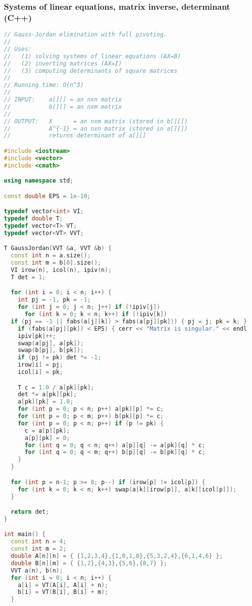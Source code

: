 \subsubsection{Systems of linear equations, matrix inverse, determinant (C++)}
\begin{lstlisting}[language=C++]
// Gauss-Jordan elimination with full pivoting.
//
// Uses:
//   (1) solving systems of linear equations (AX=B)
//   (2) inverting matrices (AX=I)
//   (3) computing determinants of square matrices
//
// Running time: O(n^3)
//
// INPUT:    a[][] = an nxn matrix
//           b[][] = an nxm matrix
//
// OUTPUT:   X      = an nxm matrix (stored in b[][])
//           A^{-1} = an nxn matrix (stored in a[][])
//           returns determinant of a[][]

#include <iostream>
#include <vector>
#include <cmath>

using namespace std;

const double EPS = 1e-10;

typedef vector<int> VI;
typedef double T;
typedef vector<T> VT;
typedef vector<VT> VVT;

T GaussJordan(VVT &a, VVT &b) {
  const int n = a.size();
  const int m = b[0].size();
  VI irow(n), icol(n), ipiv(n);
  T det = 1;

  for (int i = 0; i < n; i++) {
    int pj = -1, pk = -1;
    for (int j = 0; j < n; j++) if (!ipiv[j])
      for (int k = 0; k < n; k++) if (!ipiv[k])
  if (pj == -1 || fabs(a[j][k]) > fabs(a[pj][pk])) { pj = j; pk = k; }
    if (fabs(a[pj][pk]) < EPS) { cerr << "Matrix is singular." << endl; exit(0); }
    ipiv[pk]++;
    swap(a[pj], a[pk]);
    swap(b[pj], b[pk]);
    if (pj != pk) det *= -1;
    irow[i] = pj;
    icol[i] = pk;

    T c = 1.0 / a[pk][pk];
    det *= a[pk][pk];
    a[pk][pk] = 1.0;
    for (int p = 0; p < n; p++) a[pk][p] *= c;
    for (int p = 0; p < m; p++) b[pk][p] *= c;
    for (int p = 0; p < n; p++) if (p != pk) {
      c = a[p][pk];
      a[p][pk] = 0;
      for (int q = 0; q < n; q++) a[p][q] -= a[pk][q] * c;
      for (int q = 0; q < m; q++) b[p][q] -= b[pk][q] * c;      
    }
  }

  for (int p = n-1; p >= 0; p--) if (irow[p] != icol[p]) {
    for (int k = 0; k < n; k++) swap(a[k][irow[p]], a[k][icol[p]]);
  }

  return det;
}

int main() {
  const int n = 4;
  const int m = 2;
  double A[n][n] = { {1,2,3,4},{1,0,1,0},{5,3,2,4},{6,1,4,6} };
  double B[n][m] = { {1,2},{4,3},{5,6},{8,7} };
  VVT a(n), b(n);
  for (int i = 0; i < n; i++) {
    a[i] = VT(A[i], A[i] + n);
    b[i] = VT(B[i], B[i] + m);
  }
  

\end{lstlisting}
